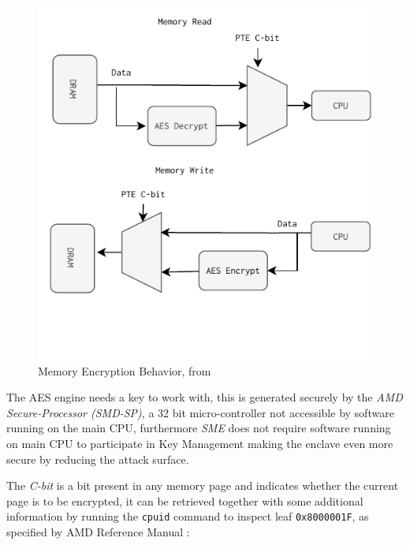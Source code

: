 \documentclass[twocolumn]{article}
\begin{document}
\begin{figure}
    \centering
    \includegraphics[scale=0.9]{img/read-write.pdf}
    \caption{Memory Encryption Behavior, from \cite{memory-encryption}}
    \label{fig:memory-encryption-fig}
\end{figure}

The AES engine needs a key to work with, this is generated securely by the \textit{AMD Secure-Processor (SMD-SP)}, a 32 bit micro-controller not accessible by software running on the main CPU, furthermore \textit{SME} does not require software running on main CPU to participate in Key Management making the enclave even more secure by reducing the attack surface.

The \textit{C-bit} is a bit present in any memory page and indicates whether the current page is to be encrypted, it can be retrieved together with some additional information by running the \texttt{cpuid} command to inspect leaf \texttt{0x8000001F}, as specified by AMD Reference Manual \cite{architecture-reference}:
\end{document}
